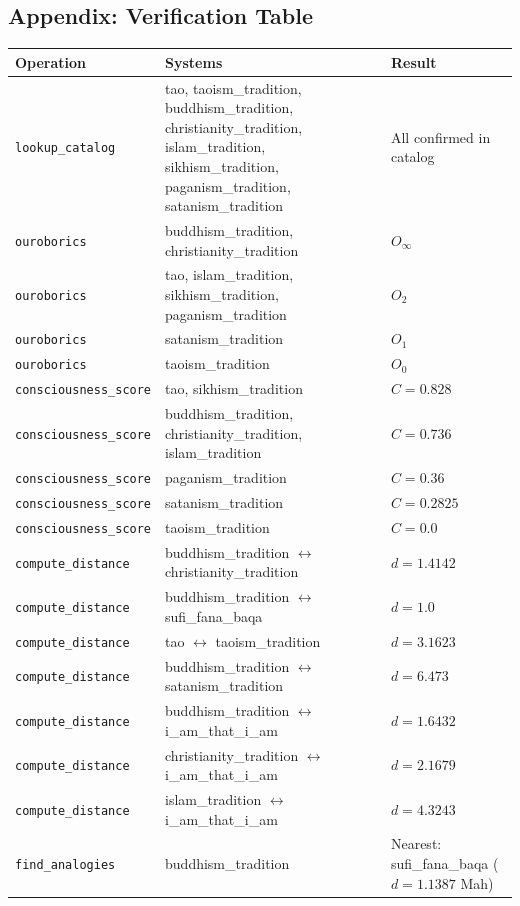 \documentclass[12pt,a4paper]{article}
\begin{document}
\subsection{Appendix: Verification Table}

\begin{table}[htbp]
\centering
\small
{}
\begin{tabularx}{\textwidth}{>{\centering\arraybackslash}X >{\centering\arraybackslash}X >{\centering\arraybackslash}X}
\toprule
\rowcolor{gray!25}\textbf{Operation} & \textbf{Systems} & \textbf{Result} \\
\midrule
\rowcolors{1}{white}{gray!10}
\texttt{lookup\_catalog} & tao, taoism\_tradition, buddhism\_tradition, christianity\_tradition, islam\_tradition, sikhism\_tradition, paganism\_tradition, satanism\_tradition & All confirmed in catalog \\
\texttt{ouroborics} & buddhism\_tradition, christianity\_tradition & $O_{\infty}$ \\
\texttt{ouroborics} & tao, islam\_tradition, sikhism\_tradition, paganism\_tradition & $O_2$ \\
\texttt{ouroborics} & satanism\_tradition & $O_1$ \\
\texttt{ouroborics} & taoism\_tradition & $O_0$ \\
\texttt{consciousness\_score} & tao, sikhism\_tradition & $C = 0.828$ \\
\texttt{consciousness\_score} & buddhism\_tradition, christianity\_tradition, islam\_tradition & $C = 0.736$ \\
\texttt{consciousness\_score} & paganism\_tradition & $C = 0.36$ \\
\texttt{consciousness\_score} & satanism\_tradition & $C = 0.2825$ \\
\texttt{consciousness\_score} & taoism\_tradition & $C = 0.0$ \\
\texttt{compute\_distance} & buddhism\_tradition $\leftrightarrow$ christianity\_tradition & $d = 1.4142$ \\
\texttt{compute\_distance} & buddhism\_tradition $\leftrightarrow$ sufi\_fana\_baqa & $d = 1.0$ \\
\texttt{compute\_distance} & tao $\leftrightarrow$ taoism\_tradition & $d = 3.1623$ \\
\texttt{compute\_distance} & buddhism\_tradition $\leftrightarrow$ satanism\_tradition & $d = 6.473$ \\
\texttt{compute\_distance} & buddhism\_tradition $\leftrightarrow$ i\_am\_that\_i\_am & $d = 1.6432$ \\
\texttt{compute\_distance} & christianity\_tradition $\leftrightarrow$ i\_am\_that\_i\_am & $d = 2.1679$ \\
\texttt{compute\_distance} & islam\_tradition $\leftrightarrow$ i\_am\_that\_i\_am & $d = 4.3243$ \\
\texttt{find\_analogies} & buddhism\_tradition & Nearest: sufi\_fana\_baqa ($d = 1.1387$ Mah) \\
\bottomrule
\end{tabularx}
\end{table}
\end{document}
